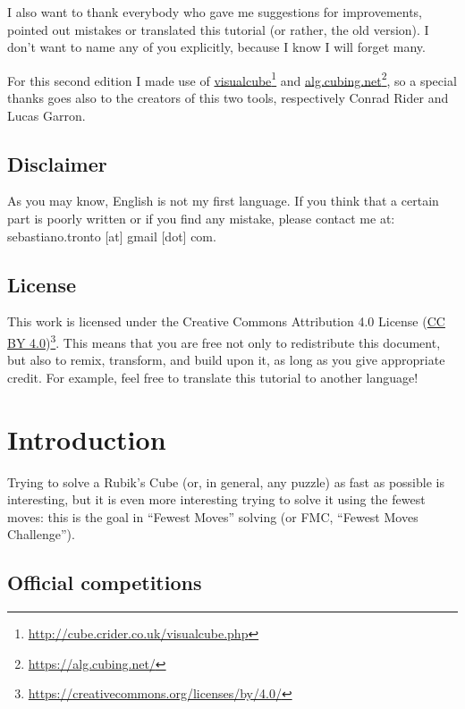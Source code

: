 \documentclass[11pt,a4paper]{book}
\begin{document}
I also want to thank everybody who gave me suggestions for improvements, pointed out mistakes or translated this tutorial (or rather, the old version). I don't want to name any of you explicitly, because I know I will forget many.

For this second edition I made use of \href{http://cube.crider.co.uk/visualcube.php}{visualcube}\footnote{\url{http://cube.crider.co.uk/visualcube.php}%
} and \href{https://alg.cubing.net/}{alg.cubing.net}\footnote{\url{https://alg.cubing.net/}}, so a special thanks goes also to the creators of this two tools, respectively Conrad Rider and Lucas Garron.

\section*{Disclaimer}

As you may know, English is not my first language. If you think that a certain part is poorly written or if you find any mistake, please contact me at:
sebastiano.tronto [at] gmail [dot] com.

\section*{License}

This work is licensed under the Creative Commons Attribution 4.0 License (\href{https://creativecommons.org/licenses/by/4.0/}{CC BY 4.0})\footnote{\url{https://creativecommons.org/licenses/by/4.0/}}. This means that you are free not only to redistribute this document, but also to remix, transform, and build upon it, as long as you give appropriate credit. For example, feel free to translate this tutorial to another language!

\tableofcontents

\chapter*{Introduction}

Trying to solve a Rubik's Cube (or, in general, any puzzle) as fast as possible is interesting, but it is even more interesting trying to solve it using the fewest moves: this is the goal in ``Fewest Moves'' solving (or FMC, ``Fewest Moves Challenge'').


\section*{Official competitions}
\end{document}
